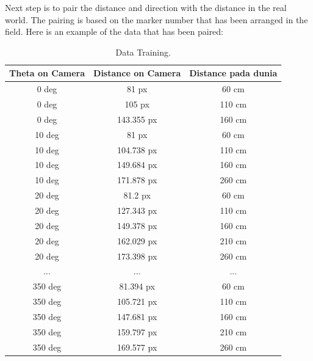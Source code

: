 Next step is to pair the distance and direction with the distance in the real world. The pairing is based on the marker number that has been arranged in the field. Here is an example of the data that has been paired: 

\begin{table}[H]
  \caption{Data Training.}
  \begin{center}
  \begin{tabular}{|c|c|c|}
    \hline
    \rowcolor[HTML]{C0C0C0}
    \textbf{Theta on Camera} & \textbf{Distance on Camera} & \textbf{Distance pada dunia} \\
    \hline
    0 deg            & 81 px                & 60 cm            \\
    0 deg            & 105 px                & 110 cm            \\
    0 deg           & 143.355 px                & 160 cm            \\
    10 deg           & 81 px                & 60 cm           \\
    10 deg           & 104.738 px                & 110 cm           \\
    10 deg           & 149.684 px                & 160 cm           \\
    10 deg           & 171.878 px                & 260 cm           \\
    20 deg           & 81.2 px                & 60 cm           \\
    20 deg           & 127.343 px                & 110 cm           \\
    20 deg           & 149.378 px                & 160 cm           \\
    20 deg           & 162.029 px                & 210 cm           \\
    20 deg           & 173.398 px                & 260 cm           \\
    ...           & ...                & ...           \\
    350 deg           & 81.394 px                & 60 cm           \\
    350 deg           & 105.721 px                & 110 cm           \\
    350 deg           & 147.681 px                & 160 cm           \\
    350 deg           & 159.797 px                & 210 cm           \\
    350 deg           & 169.577 px                & 260 cm           \\
    \hline
  \end{tabular}
  \label{tab1}
  \end{center}
\end{table}


